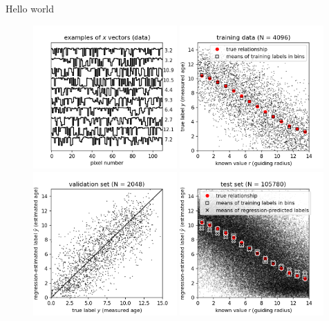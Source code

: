 \documentclass[11pt]{article}
\begin{document}
Hello world
\begin{figure}[p!]
\includegraphics[width=0.49\textwidth]{notebooks/data_examples.png}
\includegraphics[width=0.49\textwidth]{notebooks/training_data.png} \\
\includegraphics[width=0.49\textwidth]{notebooks/validation.png}
\includegraphics[width=0.49\textwidth]{notebooks/test_data_results.png}

\end{figure}
\end{document}
